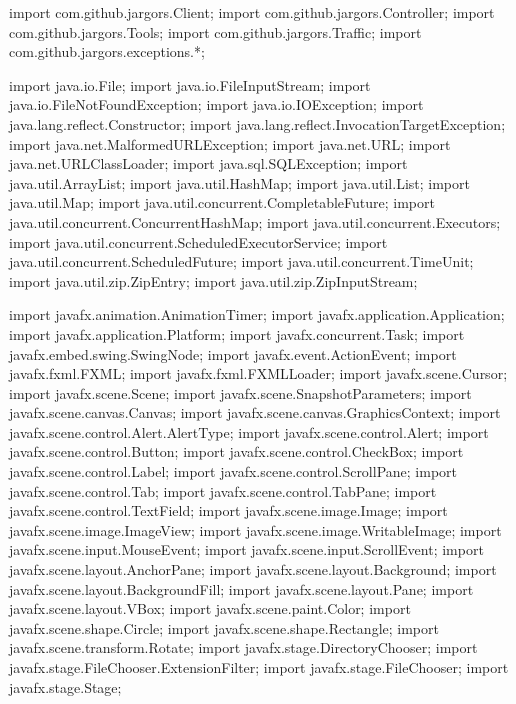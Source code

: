 \nwenddocs{}\plusendmoddef
import com.github.jargors.Client;
import com.github.jargors.Controller;
import com.github.jargors.Tools;
import com.github.jargors.Traffic;
import com.github.jargors.exceptions.*;
\nwendcode{}\nwdocspar

\nwenddocs{}\plusendmoddef
import java.io.File;
import java.io.FileInputStream;
import java.io.FileNotFoundException;
import java.io.IOException;
import java.lang.reflect.Constructor;
import java.lang.reflect.InvocationTargetException;
import java.net.MalformedURLException;
import java.net.URL;
import java.net.URLClassLoader;
import java.sql.SQLException;
import java.util.ArrayList;
import java.util.HashMap;
import java.util.List;
import java.util.Map;
import java.util.concurrent.CompletableFuture;
import java.util.concurrent.ConcurrentHashMap;
import java.util.concurrent.Executors;
import java.util.concurrent.ScheduledExecutorService;
import java.util.concurrent.ScheduledFuture;
import java.util.concurrent.TimeUnit;
import java.util.zip.ZipEntry;
import java.util.zip.ZipInputStream;
\nwendcode{}\nwdocspar

\nwenddocs{}\plusendmoddef
import javafx.animation.AnimationTimer;
import javafx.application.Application;
import javafx.application.Platform;
import javafx.concurrent.Task;
import javafx.embed.swing.SwingNode;
import javafx.event.ActionEvent;
import javafx.fxml.FXML;
import javafx.fxml.FXMLLoader;
import javafx.scene.Cursor;
import javafx.scene.Scene;
import javafx.scene.SnapshotParameters;
import javafx.scene.canvas.Canvas;
import javafx.scene.canvas.GraphicsContext;
import javafx.scene.control.Alert.AlertType;
import javafx.scene.control.Alert;
import javafx.scene.control.Button;
import javafx.scene.control.CheckBox;
import javafx.scene.control.Label;
import javafx.scene.control.ScrollPane;
import javafx.scene.control.Tab;
import javafx.scene.control.TabPane;
import javafx.scene.control.TextField;
import javafx.scene.image.Image;
import javafx.scene.image.ImageView;
import javafx.scene.image.WritableImage;
import javafx.scene.input.MouseEvent;
import javafx.scene.input.ScrollEvent;
import javafx.scene.layout.AnchorPane;
import javafx.scene.layout.Background;
import javafx.scene.layout.BackgroundFill;
import javafx.scene.layout.Pane;
import javafx.scene.layout.VBox;
import javafx.scene.paint.Color;
import javafx.scene.shape.Circle;
import javafx.scene.shape.Rectangle;
import javafx.scene.transform.Rotate;
import javafx.stage.DirectoryChooser;
import javafx.stage.FileChooser.ExtensionFilter;
import javafx.stage.FileChooser;
import javafx.stage.Stage;
\nwendcode{}\nwdocspar

